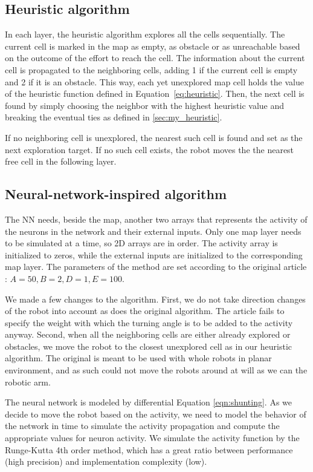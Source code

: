\documentclass[buriama8_dp.tex]{subfiles}
\begin{document}
\subsection{Heuristic algorithm}
\label{subsec:impl_heur}

In each layer, the heuristic algorithm explores all the cells sequentially. The current cell is marked in the map as empty, as obstacle or as unreachable based on the outcome of the effort to reach the cell. The information about the current cell is propagated to the neighboring cells, adding 1 if the current cell is empty and 2 if it is an obstacle. This way, each yet unexplored map cell holds the value of the heuristic function defined in Equation~\ref{eq:heuristic}. Then, the next cell is found by simply choosing the neighbor with the highest heuristic value and breaking the eventual ties as defined in \ref{sec:my_heuristic}.

If no neighboring cell is unexplored, the nearest such cell is found and set as the next exploration target. If no such cell exists, the robot moves the the nearest free cell in the following layer.

\subsection{Neural-network-inspired algorithm}
\label{subsec:impl_neuro}

The NN needs, beside the map, another two arrays that represents the activity of the neurons in the network and their external inputs. Only one map layer needs to be simulated at a time, so 2D arrays are in order. The activity array is initialized to zeros, while the external inputs are initialized to the corresponding map layer. The parameters of the method are set according to the original article \cite{neural}: \(A=50, B=2, D=1, E=100\).

We made a few changes to the algorithm. First, we do not take direction changes of the robot into account as does the original algorithm. The article fails to specify the weight with which the turning angle is to be added to the activity anyway. Second, when all the neighboring cells are either already explored or obstacles, we move the robot to the closest unexplored cell as in our heuristic algorithm. The original is meant to be used with whole robots in planar environment, and as such could not move the robots around at will as we can the robotic arm.

The neural network is modeled by differential Equation \ref{eqn:shunting}. As we decide to move the robot based on the activity, we need to model the behavior of the network in time to simulate the activity propagation and compute the appropriate values for neuron activity. We simulate the activity function by the Runge-Kutta 4th order method, which has a great ratio between performance (high precision) and implementation complexity (low).
\end{document}
